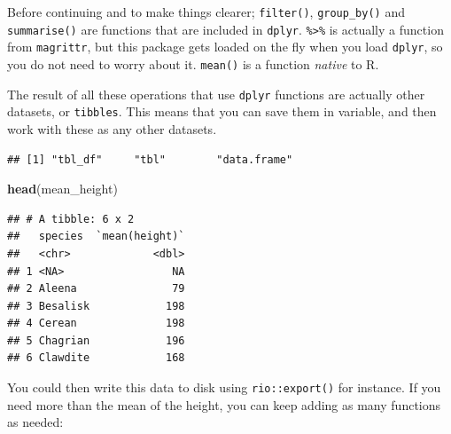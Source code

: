 \documentclass[]{gitbook}
\newenvironment{Shaded}{\begin{snugshade}}{\end{snugshade}}
\newcommand{\DataTypeTok}[1]{\textcolor[rgb]{0.13,0.29,0.53}{#1}}
\newcommand{\KeywordTok}[1]{\textcolor[rgb]{0.13,0.29,0.53}{\textbf{#1}}}
\newcommand{\NormalTok}[1]{#1}
\newcommand{\OperatorTok}[1]{\textcolor[rgb]{0.81,0.36,0.00}{\textbf{#1}}}
\newcommand{\StringTok}[1]{\textcolor[rgb]{0.31,0.60,0.02}{#1}}
\begin{document}
Before continuing and to make things clearer; \texttt{filter()}, \texttt{group\_by()} and \texttt{summarise()} are
functions that are included in \texttt{dplyr}. \texttt{\%\textgreater{}\%} is actually a function from \texttt{magrittr}, but this
package gets loaded on the fly when you load \texttt{dplyr}, so you do not need to worry about it.
\texttt{mean()} is a function \emph{native} to R.

The result of all these operations that use \texttt{dplyr} functions are actually other datasets, or
\texttt{tibbles}. This means that you can save them in variable, and then work with these as any other
datasets.

\begin{Shaded}
\end{Shaded}

\begin{verbatim}
## [1] "tbl_df"     "tbl"        "data.frame"
\end{verbatim}

\begin{Shaded}
\begin{Highlighting}[]
\KeywordTok{head}\NormalTok{(mean_height)}
\end{Highlighting}
\end{Shaded}

\begin{verbatim}
## # A tibble: 6 x 2
##   species  `mean(height)`
##   <chr>             <dbl>
## 1 <NA>                 NA
## 2 Aleena               79
## 3 Besalisk            198
## 4 Cerean              198
## 5 Chagrian            196
## 6 Clawdite            168
\end{verbatim}

You could then write this data to disk using \texttt{rio::export()} for instance. If you need more than the
mean of the height, you can keep adding as many functions as needed:

\begin{Shaded}
\end{Shaded}
\end{document}
